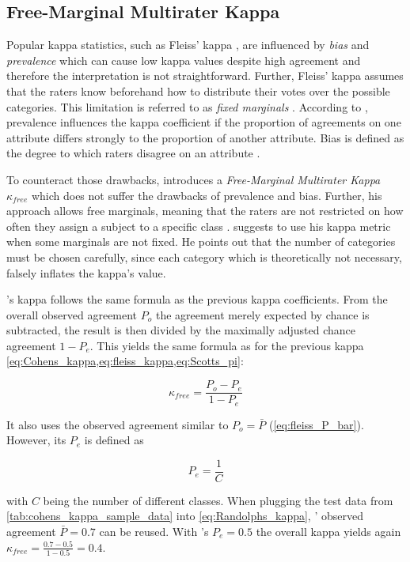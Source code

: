 \subsection{Free-Marginal Multirater Kappa}
\label{chp:fundamentals:sec:inter_rater_agreement:subsec:free_marginal_multirater_kappa}

Popular kappa statistics, such as Fleiss' kappa \parencite{Fleiss:1971}, are influenced by \textit{bias} and \textit{prevalence} which can cause low kappa values despite high agreement \parencite{Randolph:2005, Sim:2005} and therefore the interpretation is not straightforward.
Further, Fleiss' kappa assumes that the raters know beforehand how to distribute their votes over the possible categories.
This limitation is referred to as \textit{fixed marginals} \parencite{Brennan:1981}.
According to \textcite{Sim:2005}, prevalence influences the kappa coefficient if the proportion of agreements on one attribute differs strongly to the proportion of another attribute.
Bias is defined as the degree to which raters disagree on an attribute \parencite{Sim:2005}.

To counteract those drawbacks, \textcite{Randolph:2005} introduces a \textit{Free-Marginal Multirater Kappa} $\kappa_{free}$ which does not suffer the drawbacks of prevalence and bias.
Further, his approach allows free marginals, meaning that the raters are not restricted on how often they assign a subject to a specific class \parencite{Brennan:1981}.
\textcite{Randolph:2005} suggests to use his kappa metric when some marginals are not fixed.
He points out that the number of categories must be chosen carefully, since each category which is theoretically not necessary, falsely inflates the kappa's value.

's kappa \parencite{Randolph:2005} follows the same formula as the previous kappa coefficients.
From the overall observed agreement $P_o$ the agreement merely expected by chance is subtracted, the result is then divided by the maximally adjusted chance agreement $1-P_e$.
This yields the same formula as for the previous kappa \cref{eq:Cohens_kappa,eq:fleiss_kappa,eq:Scotts_pi}:

\begin{equation}\label{eq:Randolphs_kappa}
    \kappa_{free} = \frac{P_o - P_e}{1 - P_e}
\end{equation}

It also uses the observed agreement similar to \citeauthor{Fleiss:1971}  $P_o=\bar{P}$ (\cref{eq:fleiss_P_bar}).
However, its $P_e$ is defined as

\begin{equation}\label{eq:Randolphs_Pe}
P_e = \frac{1}{C}
\end{equation}

with $C$ being the number of different classes.
When plugging the test data from \cref{tab:cohens_kappa_sample_data} into \cref{eq:Randolphs_kappa}, \citeauthor{Fleiss:1971}' observed agreement $\bar{P} = 0.7$ can be reused.
With \citeauthor{Randolph:2005}'s $P_e = 0.5$ the overall kappa yields again $\kappa_{free} = \frac{0.7 - 0.5}{1 - 0.5} = 0.4$.
